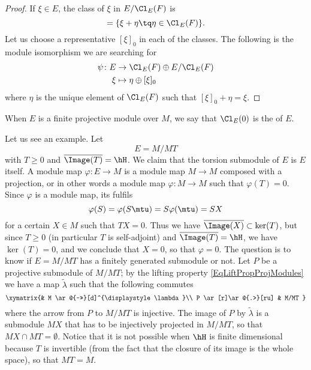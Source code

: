 \begin{proof}
If $\xi\in E$, the class of $\xi$ in $E/\Cl_E(F)$ is
\begin{equation}
	[\xi]=\{ \xi+\eta\tq \eta\in\Cl_E(F) \}.
\end{equation}
Let us choose a representative $[\xi]_0$ in each of the classes. The following is the module isomorphism we are searching for
\begin{equation}
\begin{aligned}
 \psi\colon E&\to \Cl_E(F)\oplus E/\Cl_E(F) \\ 
   \xi&\mapsto  \eta\oplus [\xi]_0 
\end{aligned}
\end{equation}
where $\eta$ is the unique element of $\Cl_E(F)$ such that $[\xi]_0+\eta=\xi$.
\end{proof}

When $E$ is a finite projective module over $M$, we say that $\Cl_E(0)$ is the  of $E$.

Let us see an example. Let 
\begin{equation}
	E=M/MT 
\end{equation}
with $T\geq 0$ and $\overline{ \Image(T) }=\hH$. We claim that the torsion submodule of $E$ is $E$ itself. A module map $\varphi\colon E\to M$ is a module map $M\to M$ composed with a projection, or in other words a module map $\varphi\colon M\to M$ such that $\varphi(T)=0$. Since $\varphi$ is a module map, its fulfils
\begin{equation}
	\varphi(S)=\varphi(S\mtu)=S\varphi(\mtu)=SX
\end{equation}
for a certain $X\in M$ such that $TX=0$. Thus we have $\overline{ \Image(X) }\subset\ker(T)$, but since $T\geq 0$ (in particular $T$ is self-adjoint) and $\overline{ \Image(T) }=\hH$, we have $\ker(T)=0$, and we conclude that $X=0$, so that $\varphi=0$. The question is to know if $E=M/MT$ has a finitely generated submodule or not. Let $P$ be a projective submodule of $M/MT$; by the lifting property \eqref{EqLiftPropProjModules} we have a map $\tilde \lambda$ such that the following commutes
\begin{equation}
\xymatrix{%
 									&  M \ar@{->>}[d]^{\displaystyle\lambda}\\
   P \ar[r]\ar@{.>}[ru]							& M/MT
}
\end{equation}
where the arrow from $P$ to $M/MT$ is injective. The image of $P$ by $\tilde\lambda$ is a submodule $MX$ that has to be injectively projected in $M/MT$, so that $MX\cap MT=\emptyset$. Notice that it is not possible when $\hH$ is finite dimensional because $T$ is invertible (from the fact that the closure of its image is the whole space), so that $MT=M$.

